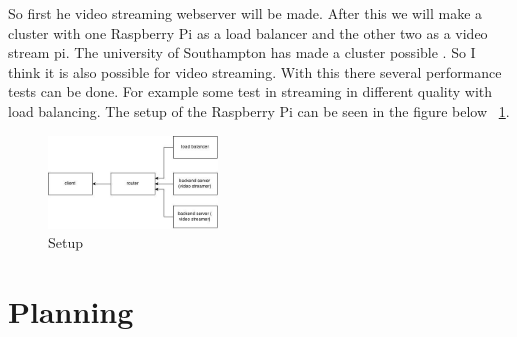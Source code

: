 \documentclass{sig-alternate-br}
\begin{document}
So first he video streaming webserver will be made. 
After this we will make a cluster with one Raspberry Pi as a load balancer and the other two as a video stream pi. The university of Southampton has made a cluster possible \cite{southampton}. So I think it is also possible for video streaming. With this there several performance tests can be done. For example some test in streaming in different quality with load balancing. The setup of the Raspberry Pi can be seen in the figure below ~\ref{fig:setup}.

\begin{figure}[H]
\centering 
\includegraphics[width=0.4\textwidth]{raspberry pi setup.jpg}
\caption{Setup}
\label{fig:setup} %
\end{figure}



\section{Planning}
\end{document}
